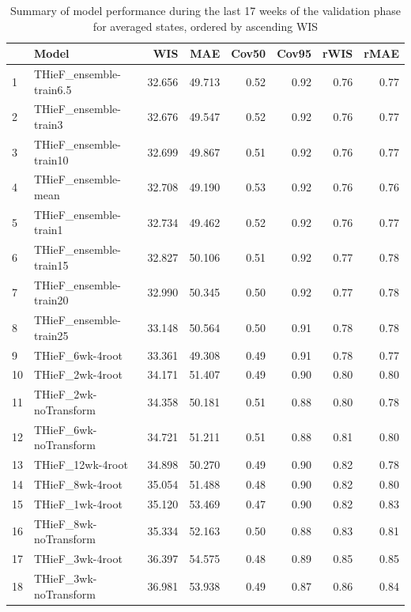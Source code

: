 \documentclass[thesis]{umassthesis}  %
\begin{document}
\begingroup\renewcommand{\arraystretch}{0.75}
\begin{longtable}{llrrrrrr}
\caption{Summary of model performance during the last 17 weeks of the validation phase for averaged states, ordered by ascending WIS} \\ 
  \hline
 & Model & WIS & MAE & Cov50 & Cov95 & rWIS & rMAE \\ 
  \hline
1 & THieF\_ensemble-train6.5 & 32.656 & 49.713 & 0.52 & 0.92 & 0.76 & 0.77 \\ 
  2 & THieF\_ensemble-train3 & 32.676 & 49.547 & 0.52 & 0.92 & 0.76 & 0.77 \\ 
  3 & THieF\_ensemble-train10 & 32.699 & 49.867 & 0.51 & 0.92 & 0.76 & 0.77 \\ 
  4 & THieF\_ensemble-mean & 32.708 & 49.190 & 0.53 & 0.92 & 0.76 & 0.76 \\ 
  5 & THieF\_ensemble-train1 & 32.734 & 49.462 & 0.52 & 0.92 & 0.76 & 0.77 \\ 
  6 & THieF\_ensemble-train15 & 32.827 & 50.106 & 0.51 & 0.92 & 0.77 & 0.78 \\ 
  7 & THieF\_ensemble-train20 & 32.990 & 50.345 & 0.50 & 0.92 & 0.77 & 0.78 \\ 
  8 & THieF\_ensemble-train25 & 33.148 & 50.564 & 0.50 & 0.91 & 0.78 & 0.78 \\ 
  9 & THieF\_6wk-4root & 33.361 & 49.308 & 0.49 & 0.91 & 0.78 & 0.77 \\ 
  10 & THieF\_2wk-4root & 34.171 & 51.407 & 0.49 & 0.90 & 0.80 & 0.80 \\ 
  11 & THieF\_2wk-noTransform & 34.358 & 50.181 & 0.51 & 0.88 & 0.80 & 0.78 \\ 
  12 & THieF\_6wk-noTransform & 34.721 & 51.211 & 0.51 & 0.88 & 0.81 & 0.80 \\ 
  13 & THieF\_12wk-4root & 34.898 & 50.270 & 0.49 & 0.90 & 0.82 & 0.78 \\ 
  14 & THieF\_8wk-4root & 35.054 & 51.488 & 0.48 & 0.90 & 0.82 & 0.80 \\ 
  15 & THieF\_1wk-4root & 35.120 & 53.469 & 0.47 & 0.90 & 0.82 & 0.83 \\ 
  16 & THieF\_8wk-noTransform & 35.334 & 52.163 & 0.50 & 0.88 & 0.83 & 0.81 \\ 
  17 & THieF\_3wk-4root & 36.397 & 54.575 & 0.48 & 0.89 & 0.85 & 0.85 \\ 
  18 & THieF\_3wk-noTransform & 36.981 & 53.938 & 0.49 & 0.87 & 0.86 & 0.84 \\ 

\end{longtable}
\end{document}
